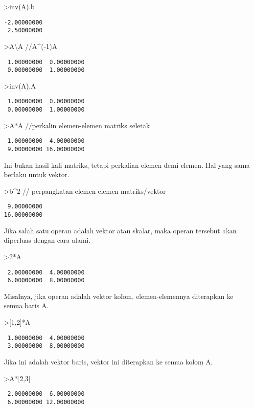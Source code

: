 \documentclass[
]{book}
\begin{document}
\textgreater inv(A).b

\begin{verbatim}
-2.00000000 
 2.50000000 
\end{verbatim}

\textgreater A\textbackslash A //A\^{}(-1)A

\begin{verbatim}
 1.00000000  0.00000000 
 0.00000000  1.00000000 
\end{verbatim}

\textgreater inv(A).A

\begin{verbatim}
 1.00000000  0.00000000 
 0.00000000  1.00000000 
\end{verbatim}

\textgreater A*A //perkalin elemen-elemen matriks seletak

\begin{verbatim}
 1.00000000  4.00000000 
 9.00000000 16.00000000 
\end{verbatim}

Ini bukan hasil kali matriks, tetapi perkalian elemen demi elemen. Hal yang sama berlaku untuk vektor.

\textgreater b\^{}2 // perpangkatan elemen-elemen matriks/vektor

\begin{verbatim}
 9.00000000 
16.00000000 
\end{verbatim}

Jika salah satu operan adalah vektor atau skalar, maka operan tersebut akan diperluas dengan cara alami.

\textgreater2*A

\begin{verbatim}
 2.00000000  4.00000000 
 6.00000000  8.00000000 
\end{verbatim}

Misalnya, jika operan adalah vektor kolom, elemen-elemennya diterapkan ke semua baris A.

\textgreater{[}1,2{]}*A

\begin{verbatim}
 1.00000000  4.00000000 
 3.00000000  8.00000000 
\end{verbatim}

Jika ini adalah vektor baris, vektor ini diterapkan ke semua kolom A.

\textgreater A*{[}2,3{]}

\begin{verbatim}
 2.00000000  6.00000000 
 6.00000000 12.00000000 
\end{verbatim}
\end{document}
